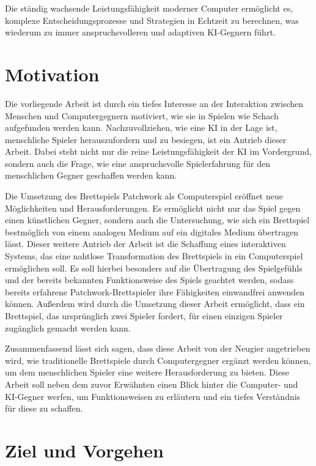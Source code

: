 Die ständig wachsende Leistungsfähigkeit moderner Computer ermöglicht es, komplexe Entscheidungsprozesse und Strategien in Echtzeit zu berechnen, was wiederum zu immer anspruchsvolleren und adaptiven \ac{KI}-Gegnern führt.

\section{Motivation}
\label{chapter:motivation}

Die vorliegende Arbeit ist durch ein tiefes Interesse an der Interaktion zwischen Menschen und Computergegnern motiviert, wie sie in Spielen wie Schach aufgefunden werden kann. Nachzuvollziehen, wie eine \ac{KI} in der Lage ist, menschliche Spieler herauszufordern und zu besiegen, ist ein Antrieb dieser Arbeit. Dabei steht nicht nur die reine Leistungsfähigkeit der \ac{KI} im Vordergrund, sondern auch die Frage, wie eine anspruchsvolle Spielerfahrung für den menschlichen Gegner geschaffen werden kann.

Die Umsetzung des Brettspiels Patchwork als Computerspiel eröffnet neue Möglichkeiten und Herausforderungen. Es ermöglicht nicht nur das Spiel gegen einen künstlichen Gegner, sondern auch die Untersuchung, wie sich ein Brettspiel bestmöglich von einem analogen Medium auf ein digitales Medium übertragen lässt. Dieser weitere Antrieb der Arbeit ist die Schaffung eines interaktiven Systems, das eine nahtlose Transformation des Brettspiels in ein Computerspiel ermöglichen soll. Es soll hierbei besonders auf die Übertragung des Spielgefühls und der bereits bekannten Funktionsweise des Spiels geachtet werden, sodass bereits erfahrene Patchwork-Brettspieler ihre Fähigkeiten einwandfrei anwenden können. Außerdem wird durch die Umsetzung dieser Arbeit ermöglicht, dass ein Brettspiel, das ursprünglich zwei Spieler fordert, für einen einzigen Spieler zugänglich gemacht werden kann.

Zusammenfassend lässt sich sagen, dass diese Arbeit von der Neugier angetrieben wird, wie traditionelle Brettspiele durch Computergegner ergänzt werden können, um dem menschlichen Spieler eine weitere Herausforderung zu bieten. Diese Arbeit soll neben dem zuvor Erwähnten einen Blick hinter die Computer- und \ac{KI}-Gegner werfen, um Funktionsweisen zu erläutern und ein tiefes Verständnis für diese zu schaffen.

\section{Ziel und Vorgehen}
\label{chapter:ziel-und-vorgehen}

